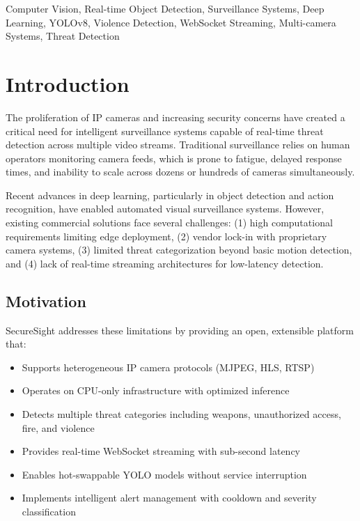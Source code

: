 \documentclass[conference]{IEEEtran}
\begin{document}
\begin{IEEEkeywords}
Computer Vision, Real-time Object Detection, Surveillance Systems, Deep Learning, YOLOv8, Violence Detection, WebSocket Streaming, Multi-camera Systems, Threat Detection
\end{IEEEkeywords}

\section{Introduction}
The proliferation of IP cameras and increasing security concerns have created a critical need for intelligent surveillance systems capable of real-time threat detection across multiple video streams. Traditional surveillance relies on human operators monitoring camera feeds, which is prone to fatigue, delayed response times, and inability to scale across dozens or hundreds of cameras simultaneously.

Recent advances in deep learning, particularly in object detection and action recognition, have enabled automated visual surveillance systems. However, existing commercial solutions face several challenges: (1) high computational requirements limiting edge deployment, (2) vendor lock-in with proprietary camera systems, (3) limited threat categorization beyond basic motion detection, and (4) lack of real-time streaming architectures for low-latency detection.

\subsection{Motivation}
SecureSight addresses these limitations by providing an open, extensible platform that:
\begin{itemize}
    \item Supports heterogeneous IP camera protocols (MJPEG, HLS, RTSP)
    \item Operates on CPU-only infrastructure with optimized inference
    \item Detects multiple threat categories including weapons, unauthorized access, fire, and violence
    \item Provides real-time WebSocket streaming with sub-second latency
    \item Enables hot-swappable YOLO models without service interruption
    \item Implements intelligent alert management with cooldown and severity classification
\end{itemize}
\end{document}
